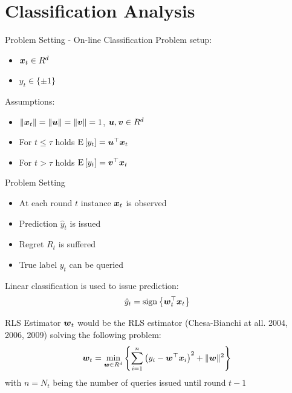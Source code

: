 \documentclass{beamer}
\begin{document}
\section{Classification Analysis}




\begin{frame}{Problem Setting - On-line Classification}
Problem setup:\newline
\begin{itemize}
\item ${\boldsymbol{x}}_{t}\in R^d$\newline
\item $y_t\in\{\pm1\}$\newline
\end{itemize}
Assumptions:\newline
\begin{itemize}
\item $\|{\boldsymbol{x}}_{t}\|=\|{\boldsymbol{u}}\|=\|{\boldsymbol{v}}\|=1$, ${\boldsymbol{u}},{\boldsymbol{v}}\in R^d$ \newline
\item For $t\leq\tau$ holds ${\rm E}\left[{y_t}\right]={{\boldsymbol{u}}}^{\top}{\boldsymbol{x}}_{t}$\newline
\item For $t>\tau$ holds ${\rm E}\left[{y_t}\right]={{\boldsymbol{v}}}^{\top}{\boldsymbol{x}}_{t}$
\end{itemize}
\end{frame}

\begin{frame}{Problem Setting}
\begin{itemize}
\item At each round $t$ instance ${\boldsymbol{x}}_{t}$ is observed\newline
\item Prediction $\hat{y}_t$ is issued\newline
\item Regret $R_t$ is suffered\newline
\item True label $y_t$ can be queried \newline
\end{itemize}
Linear classification is used to issue prediction:
\begin{equation}
\hat{y}_t={\rm sign}\left\{{{\boldsymbol{w}}}^{\top}_{t}{\boldsymbol{x}}_{t}\right\}
\end{equation}
\end{frame}

\begin{frame}{RLS Estimator}
${\boldsymbol{w}}_{t}$ would be the RLS estimator (Chesa-Bianchi at all. 2004, 2006, 2009) solving the following problem:\newline\newline
\begin{equation}
{\boldsymbol{w}}_{t}=\min_{{\boldsymbol{w}}\in R^d}{\left\{\sum\limits_{i=1}^{n}\left(y_i-{{\boldsymbol{w}}}^{\top}{\boldsymbol{x}}_{i}\right)^2+\|{\boldsymbol{w}}\|^2\right\}}
\label{RLS_prob}
\end{equation}\newline\newline
with $n=N_t$ being the number of queries issued until round $t-1$
\end{frame}
\end{document}

